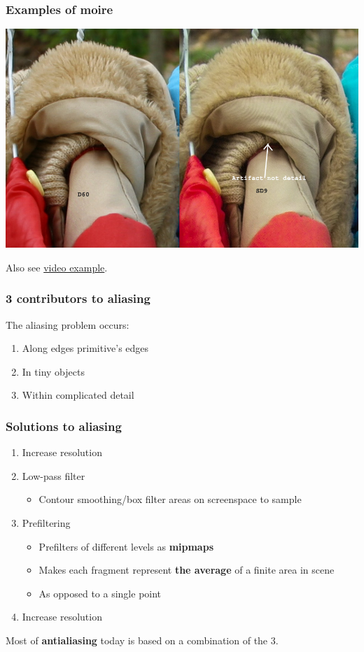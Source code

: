 \documentclass{beamer}
\begin{document}
\begin{frame}
    \frametitle{Examples of moire}

    \includegraphics[scale=0.3]{images/small-moire-artifact.jpg}

    Also see \href{https://www.youtube.com/watch?v=ovztfpWPo5M}{video example}.

\end{frame}

\begin{frame}
    \frametitle{3 contributors to aliasing}

    The aliasing problem occurs:
    \begin{enumerate}
        \item Along edges primitive's edges
        \item In tiny objects
        \item Within complicated detail
    \end{enumerate}

\end{frame}

\begin{frame}
    \frametitle{Solutions to aliasing}

    \begin{enumerate}
        \item Increase resolution
        \item Low-pass filter
        \begin{itemize}
            \item Contour smoothing/box filter areas on screenspace to sample
        \end{itemize}
        \item Prefiltering
        \begin{itemize}
            \item Prefilters of different levels as \textbf{mipmaps}
            \item Makes each fragment represent \textbf{the average} of a finite area in scene
            \item As opposed to a single point
        \end{itemize}
        \item Increase resolution
    \end{enumerate}
    Most of \textbf{antialiasing} today is based on a combination of the 3.

\end{frame}
\end{document}
